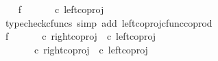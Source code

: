 \begin{isabellebody}
\isanewline
\ \ \isamarkupfalse%
\ f{}{\isacharcolon}{\kern0pt}\ {\isachardoublequoteopen}{\isasymlangle}{\isasymt}{\isacharcomma}{\kern0pt}{\isasymt}{\isasymrangle}\ {\isasymamalg}\ {\isasymlangle}{\isasymf}{\isacharcomma}{\kern0pt}\ {\isasymf}{\isasymrangle}\ {\isasymamalg}\ {\isasymlangle}{\isasymf}{\isacharcomma}{\kern0pt}{\isasymt}{\isasymrangle}\ {\isasymcirc}\isactrlsub c\ left{\isacharunderscore}{\kern0pt}coproj\ {\isasymone}\ {\isacharparenleft}{\kern0pt}{\isasymone}\ {\isasymCoprod}\ {\isasymone}{\isacharparenright}{\kern0pt}\ {\isacharequal}{\kern0pt}\ {\isasymlangle}{\isasymt}{\isacharcomma}{\kern0pt}{\isasymt}{\isasymrangle}{\isachardoublequoteclose}\isanewline
\ \ \ \ \isamarkupfalse%
\ {\isacharparenleft}{\kern0pt}typecheck{\isacharunderscore}{\kern0pt}cfuncs{\isacharcomma}{\kern0pt}\ simp\ add{\isacharcolon}{\kern0pt}\ left{\isacharunderscore}{\kern0pt}coproj{\isacharunderscore}{\kern0pt}cfunc{\isacharunderscore}{\kern0pt}coprod{\isacharparenright}{\kern0pt}\isanewline
\ \ \isamarkupfalse%
\ f{}{\isacharcolon}{\kern0pt}\ {\isachardoublequoteopen}{\isasymlangle}{\isasymt}{\isacharcomma}{\kern0pt}{\isasymt}{\isasymrangle}\ {\isasymamalg}\ {\isasymlangle}{\isasymf}{\isacharcomma}{\kern0pt}\ {\isasymf}{\isasymrangle}\ {\isasymamalg}\ {\isasymlangle}{\isasymf}{\isacharcomma}{\kern0pt}{\isasymt}{\isasymrangle}\ {\isasymcirc}\isactrlsub c\ {\isacharparenleft}{\kern0pt}right{\isacharunderscore}{\kern0pt}coproj\ {\isasymone}\ {\isacharparenleft}{\kern0pt}{\isasymone}{\isasymCoprod}{\isasymone}{\isacharparenright}{\kern0pt}{\isasymcirc}\isactrlsub c\ left{\isacharunderscore}{\kern0pt}coproj\ {\isasymone}\ {\isasymone}{\isacharparenright}{\kern0pt}\ {\isacharequal}{\kern0pt}\ {\isasymlangle}{\isasymf}{\isacharcomma}{\kern0pt}\ {\isasymf}{\isasymrangle}{\isachardoublequoteclose}\isanewline
\ \ \isamarkupfalse%
{\isacharminus}{\kern0pt}\ \isanewline
\ \ \ \ \isamarkupfalse%
\ {\isachardoublequoteopen}{\isasymlangle}{\isasymt}{\isacharcomma}{\kern0pt}{\isasymt}{\isasymrangle}\ {\isasymamalg}\ {\isasymlangle}{\isasymf}{\isacharcomma}{\kern0pt}\ {\isasymf}{\isasymrangle}\ {\isasymamalg}\ {\isasymlangle}{\isasymf}{\isacharcomma}{\kern0pt}{\isasymt}{\isasymrangle}\ {\isasymcirc}\isactrlsub c\ {\isacharparenleft}{\kern0pt}right{\isacharunderscore}{\kern0pt}coproj\ {\isasymone}\ {\isacharparenleft}{\kern0pt}{\isasymone}{\isasymCoprod}{\isasymone}{\isacharparenright}{\kern0pt}{\isasymcirc}\isactrlsub c\ left{\isacharunderscore}{\kern0pt}coproj\ {\isasymone}\ {\isasymone}{\isacharparenright}{\kern0pt}\ {\isacharequal}{\kern0pt}\ \isanewline

\end{isabellebody}
